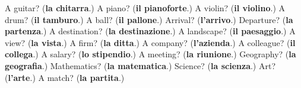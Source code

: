 \begin{tcolorbox}[breakable,colback=teal!4,colframe=teal!35!black,title={Before you move on}]
A guitar? (\textbf{la chitarra}.) A piano? (\textbf{il pianoforte}.) A violin? (\textbf{il violino}.) A drum? (\textbf{il tamburo}.) A ball? (\textbf{il pallone}.) Arrival? (\textbf{l'arrivo}.) Departure? (\textbf{la partenza}.) A destination? (\textbf{la destinazione}.) A landscape? (\textbf{il paesaggio}.) A view? (\textbf{la vista}.) A firm? (\textbf{la ditta}.) A company? (\textbf{l'azienda}.) A colleague? (\textbf{il collega}.) A salary? (\textbf{lo stipendio}.) A meeting? (\textbf{la riunione}.) Geography? (\textbf{la geografia}.) Mathematics? (\textbf{la matematica}.) Science? (\textbf{la scienza}.) Art? (\textbf{l'arte}.) A match? (\textbf{la partita}.)
\end{tcolorbox}
